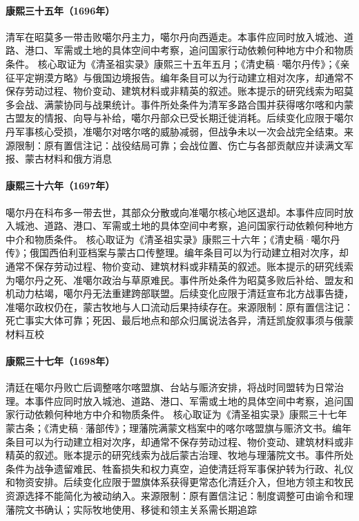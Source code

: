 \hypertarget{civic:EQ-1696-JAOMODO}{}\paragraph{康熙三十五年（1696年）}清军在昭莫多一带击败噶尔丹主力，噶尔丹向西遁走。本事件应同时放入城池、道路、港口、军需或土地的具体空间中考察，追问国家行动依赖何种地方中介和物质条件。 核心取证为《清圣祖实录》康熙三十五年五月；《清史稿·噶尔丹传》；《亲征平定朔漠方略》与俄国边境报告。编年条目可以为行动建立相对次序，却通常不保存劳动过程、物价变动、建筑材料或非精英的叙述。账本提示的研究线索为昭莫多会战、满蒙协同与战果统计。事件所处条件为清军多路合围并获得喀尔喀和内蒙古盟友的情报、向导与补给，噶尔丹部众已受长期迁徙消耗。后续变化应限于噶尔丹军事核心受损，准噶尔对喀尔喀的威胁减弱，但战争未以一次会战完全结束。来源限制：原有置信注记：战役结局可靠；会战位置、伤亡与各部贡献应并读满文军报、蒙古材料和俄方消息
\hypertarget{civic:EQ-1697-GALDAN-DEATH}{}\paragraph{康熙三十六年（1697年）}噶尔丹在科布多一带去世，其部众分散或向准噶尔核心地区退却。本事件应同时放入城池、道路、港口、军需或土地的具体空间中考察，追问国家行动依赖何种地方中介和物质条件。 核心取证为《清圣祖实录》康熙三十六年；《清史稿·噶尔丹传》；俄国西伯利亚档案与蒙古口传整理。编年条目可以为行动建立相对次序，却通常不保存劳动过程、物价变动、建筑材料或非精英的叙述。账本提示的研究线索为噶尔丹之死、准噶尔政治与草原难民。事件所处条件为昭莫多败后补给、盟友和机动力枯竭，噶尔丹无法重建跨部联盟。后续变化应限于清廷宣布北方战事告捷，准噶尔政权仍在，蒙古牧地与人口流动后果持续存在。来源限制：原有置信注记：死亡事实大体可靠；死因、最后地点和部众归属说法各异，清廷凯旋叙事须与俄蒙材料互校
\hypertarget{civic:EQ-1698-KHALKHA-ADMINISTRATION}{}\paragraph{康熙三十七年（1698年）}清廷在噶尔丹败亡后调整喀尔喀盟旗、台站与赈济安排，将战时同盟转为日常治理。本事件应同时放入城池、道路、港口、军需或土地的具体空间中考察，追问国家行动依赖何种地方中介和物质条件。 核心取证为《清圣祖实录》康熙三十七年蒙古条；《清史稿·藩部传》；理藩院满蒙文档案中的喀尔喀盟旗与赈济文书。编年条目可以为行动建立相对次序，却通常不保存劳动过程、物价变动、建筑材料或非精英的叙述。账本提示的研究线索为战后蒙古治理、牧地与理藩院文书。事件所处条件为战争遗留难民、牲畜损失和权力真空，迫使清廷将军事保护转为行政、礼仪和物资安排。后续变化应限于盟旗体系获得更常态化清廷介入，但地方领主和牧民资源选择不能简化为被动纳入。来源限制：原有置信注记：制度调整可由谕令和理藩院文书确认；实际牧地使用、移徙和领主关系需长期追踪
